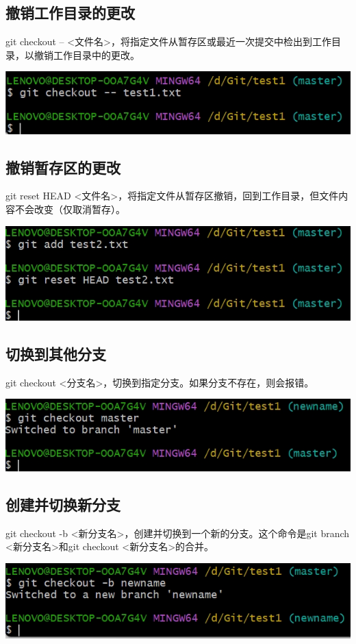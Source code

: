 \documentclass[UTF8,a4paper]{ctexart}
\begin{document}
\begin{sloppypar}
	\subsection{撤销工作目录的更改}
	git checkout -- <文件名>，将指定文件从暂存区或最近一次提交中检出到工作目录，以撤销工作目录中的更改。
	
	\includegraphics[width = 16cm]{17}
	
	\subsection{撤销暂存区的更改}
	git reset HEAD <文件名>，将指定文件从暂存区撤销，回到工作目录，但文件内容不会改变（仅取消暂存）。
	
	\includegraphics[width = 16cm]{18}
	
	\subsection{切换到其他分支}
	git checkout <分支名>，切换到指定分支。如果分支不存在，则会报错。
	
	\includegraphics[width = 16cm]{19}
	
	\subsection{创建并切换新分支}
	git checkout -b <新分支名>，创建并切换到一个新的分支。这个命令是git branch <新分支名>和git checkout <新分支名>的合并。
	
	\includegraphics[width = 16cm]{20}
	

\end{sloppypar}
\end{document}
